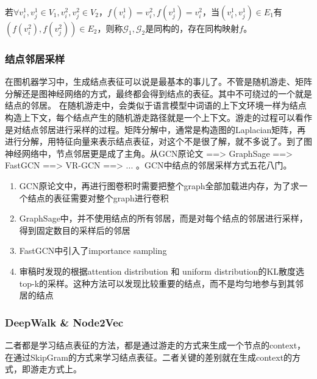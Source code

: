 若$\forall v_i^1, v_j^1 \in V_1, v_i^2, v_j^2 \in V_2$，$f(v_i^1) = v_i^2, f(v_j^1) = v_i^2$，当$(v_i^1, v_j^1) \in E_1$有$( f(v_i^2), f(v_j^2) ) \in E_2$，则称$\mathcal{G}_1, \mathcal{G}_2$是同构的，存在同构映射$f$。

\subsubsection{结点邻居采样}
在图机器学习中，生成结点表征可以说是最基本的事儿了。不管是随机游走、矩阵分解还是图神经网络的方式，最终都会得到结点的表征。其中不可绕过的一个就是结点的邻居。
在随机游走中，会类似于语言模型中词语的上下文环境一样为结点构造上下文，每个结点产生的随机游走路径就是一个上下文。游走的过程可以看作是对结点邻居进行采样的过程。矩阵分解中，通常是构造图的Laplacian矩阵，再进行分解，用特征向量来表示结点表征，对这个不是很了解，就不多说了。到了图神经网络中，节点邻居更是成了主角。从GCN原论文\cite{kipf2017semi-supervised} ==> GraphSage\cite{hamilton2017inductive} ==> FastGCN\cite{chen2018fastgcn} ==> VR-GCN\cite{chen2018stochastic} ==> ... 。GCN中结点的邻居采样方式五花八门。

\begin{enumerate}
	\item GCN原论文中，再进行图卷积时需要把整个graph全部加载进内存，为了求一个结点的表征需要对整个graph进行卷积
	\item GraphSage中，并不使用结点的所有邻居，而是对每个结点的邻居进行采样，得到固定数目的采样后的邻居
	\item FastGCN中引入了importance sampling
	\item 审稿时发现的根据attention distribution 和 uniform distribution的KL散度选top-k的采样。这种方法可以发现比较重要的结点，而不是均匀地参与到其邻居的结点
\end{enumerate}

\subsubsection{DeepWalk \& Node2Vec}
二者都是学习结点表征的方法，都是通过游走的方式来生成一个节点的context，在通过SkipGram的方式来学习结点表征。二者关键的差别就在生成context的方式，即游走方式上。


